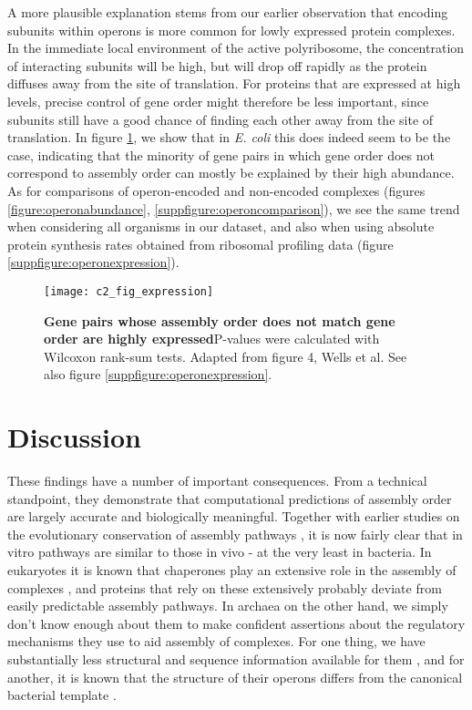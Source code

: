 \documentclass[a4paper,11pt,twoside,openright]{scrbook}
\begin{document}
A more plausible explanation stems from our earlier observation that encoding
subunits within operons is more common for lowly expressed protein complexes. In
the immediate local environment of the active polyribosome, the concentration of
interacting subunits will be high, but will drop off rapidly as the protein
diffuses away from the site of translation. For proteins that are expressed at
high levels, precise control of gene order might therefore be less important,
since subunits still have a good chance of finding each other away from the site
of translation. In figure \ref{figure:operonexpression}, we show that in
\textit{E. coli} this does indeed seem to be the case, indicating that the
minority of gene pairs in which gene order does not correspond to assembly order
can mostly be explained by their high abundance. As for comparisons of
operon-encoded and non-encoded complexes (figures \ref{figure:operonabundance},
\ref{suppfigure:operoncomparison}), we see the same trend when considering all
organisms in our dataset, and also when using absolute protein synthesis rates
obtained from ribosomal profiling data (figure
\ref{suppfigure:operonexpression}).

\begin{figure}[h]
\fcapsideright
    {\caption[Gene pairs whose assembly order does not match gene order are
    highly expressed]{\sffamily\textbf{Gene pairs whose assembly order does not
    match gene order are highly expressed}\newline \small P-values were
    calculated with Wilcoxon rank-sum tests. Adapted from figure 4, Wells et al.
    \cite{Wells2016} See also figure
    \ref{suppfigure:operonexpression}.}\label{figure:operonexpression}}
    {\texttt{[image: c2\_fig\_expression]}}
\end{figure}

\section{Discussion}
These findings have a number of important consequences. From a technical
standpoint, they demonstrate that computational predictions of assembly order
are largely accurate and biologically meaningful. Together with earlier studies
on the evolutionary conservation of assembly pathways \cite{Levy2008,Marsh2013},
it is now fairly clear that in vitro pathways are similar to those in vivo - at
the very least in bacteria. In eukaryotes it is known that chaperones play an
extensive role in the assembly of complexes \cite{Ellis2006}, and proteins that
rely on these extensively probably deviate from easily predictable assembly
pathways. In archaea on the other hand, we simply don't know enough about them
to make confident assertions about the regulatory mechanisms they use to aid
assembly of complexes. For one thing, we have substantially less structural and
sequence information available for them \cite{Mukherjee2017}, and for another,
it is known that the structure of their operons differs from the canonical
bacterial template \cite{Koide2009}.
\end{document}
